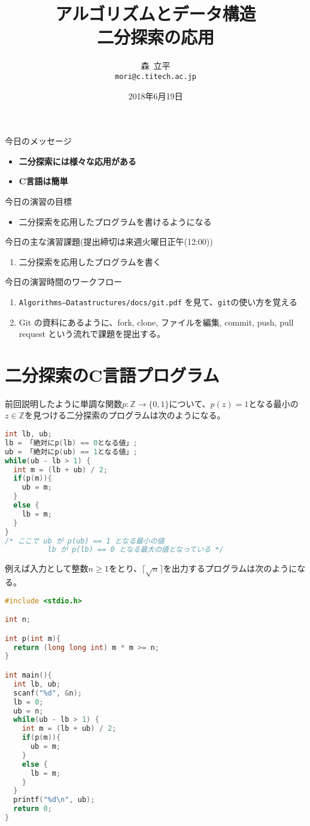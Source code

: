 \documentclass[a4paper,twoside,onecolumn,openany,article,10pt]{memoir}
\title{アルゴリズムとデータ構造\\\vspace{.5em} \Large 二分探索の応用}
\date{2018年6月19日}
\author{森~立平\\ \texttt{mori@c.titech.ac.jp}}
\theoremstyle{remark}
\begin{document}
\maketitle


\noindent
今日のメッセージ
\begin{itemize}
\item \textbf{二分探索には様々な応用がある}
\item \textbf{C言語は簡単}
\end{itemize}

\noindent
今日の演習の目標
\begin{itemize}
\item 二分探索を応用したプログラムを書けるようになる
\end{itemize}

\noindent
今日の主な演習課題(提出締切は来週火曜日正午(12:00))
\begin{enumerate}
\item 二分探索を応用したプログラムを書く
\end{enumerate}

\noindent
今日の演習時間のワークフロー
\begin{enumerate}
\item \texttt{Algorithms--Datastructures/docs/git.pdf} を見て、\texttt{git}の使い方を覚える
\item Git の資料にあるように、fork, clone, ファイルを編集, commit, push, pull request という流れで課題を提出する。
\end{enumerate}

\section{二分探索のC言語プログラム}
前回説明したように単調な関数$p\colon \mathbb{Z}\to\{0,1\}$について、$p(z)=1$となる最小の$z\in\mathbb{Z}$を見つける二分探索のプログラムは次のようになる。
\begin{lstlisting}[basicstyle=\ttfamily\normalsize,showstringspaces=false,language=C,frame=single]
int lb, ub;
lb = 「絶対にp(lb) == 0となる値」;
ub = 「絶対にp(ub) == 1となる値」;
while(ub - lb > 1) {
  int m = (lb + ub) / 2;
  if(p(m)){
    ub = m;
  }
  else {
    lb = m;
  }
}
/* ここで ub が p(ub) == 1 となる最小の値
          lb が p(lb) == 0 となる最大の値となっている */
\end{lstlisting}

例えば入力として整数$n\ge 1$をとり、$\lceil\sqrt{n}\rceil$を出力するプログラムは次のようになる。
\begin{lstlisting}[basicstyle=\ttfamily\normalsize,showstringspaces=false,language=C,frame=single]
#include <stdio.h>

int n;

int p(int m){
  return (long long int) m * m >= n;
}

int main(){
  int lb, ub;
  scanf("%d", &n);
  lb = 0;
  ub = n;
  while(ub - lb > 1) {
    int m = (lb + ub) / 2;
    if(p(m)){
      ub = m;
    }
    else {
      lb = m;
    }
  }
  printf("%d\n", ub);
  return 0;
}
\end{lstlisting}
\end{document}
